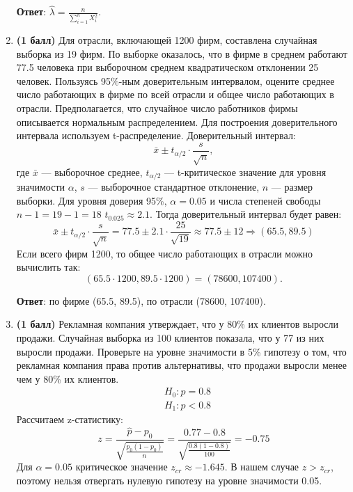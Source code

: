 \documentclass{assignment}
\begin{document}
\begin{enumerate}
    \textbf{Ответ}: $\hat{\lambda} = \frac{n}{\sum_{i=1}^{n} X_i^2}$.
    \finish

    \item \textbf{(1 балл)} Для отрасли, включающей 1200 фирм, составлена случайная выборка из 19 фирм. По выборке оказалось, что в фирме в среднем работают 77.5 человека при выборочном среднем квадратическом отклонении 25 человек. Пользуясь 95\%-ным доверительным интервалом, оцените среднее число работающих в фирме по всей отрасли и общее число работающих в отрасли. Предполагается, что случайное число работников фирмы описывается нормальным распределением.
    \start
    Для построения доверительного интервала используем t-распределение. Доверительный интервал:
    \begin{equation}
        \bar{x} \pm t_{\alpha/2}\cdot \frac{s}{\sqrt{n}},
    \end{equation}
    где $\bar{x}$ — выборочное среднее, $t_{\alpha/2}$ — t-критическое значение для уровня значимости $\alpha$, $s$ — выборочное стандартное отклонение, $n$ — размер выборки. Для уровня доверия 95\%, $\alpha = 0.05$ и числа степеней свободы $n-1 = 19-1 = 18$ $t_0.025 \approx 2.1$. Тогда доверительный интервал будет равен:
    \begin{equation}
        \bar{x} \pm t_{\alpha/2}\cdot \frac{s}{\sqrt{n}} = 77.5 \pm 2.1\cdot \frac{25}{\sqrt{19}} \approx 77.5 \pm 12 \Rightarrow (65.5, 89.5)
    \end{equation}
    Если всего фирм 1200, то общее число работающих в отрасли можно вычислить так:
    \begin{equation}
        (65.5\cdot 1200, 89.5\cdot 1200) = (78600, 107400).
    \end{equation}

    \textbf{Ответ}: по фирме (65.5, 89.5), по отрасли (78600, 107400).
    \finish

    \item \textbf{(1 балл)} Рекламная компания утверждает, что у 80\% их клиентов выросли продажи. Случайная выборка из 100 клиентов показала, что у 77 из них выросли продажи. Проверьте на уровне значимости в 5\% гипотезу о том, что рекламная компания права против альтернативы, что продажи выросли менее чем у 80\% их клиентов.
    \start
    \begin{align*}
        &H_0: p=0.8 \\
        &H_1: p<0.8
    \end{align*}
    Рассчитаем z-статистику:
    \begin{equation}
        z = \frac{\hat{p} - p_0}{\sqrt{\frac{p_0(1-p_0)}{n}}} = \frac{0.77 - 0.8}{\sqrt{\frac{0.8(1-0.8)}{100}}} = -0.75
    \end{equation}
    Для $\alpha = 0.05$ критическое значение $z_{cr} \approx -1.645$. В нашем случае $z > z_{cr}$, поэтому нельзя отвергать нулевую гипотезу на уровне значимости 0.05.
    

\end{enumerate}
\end{document}
